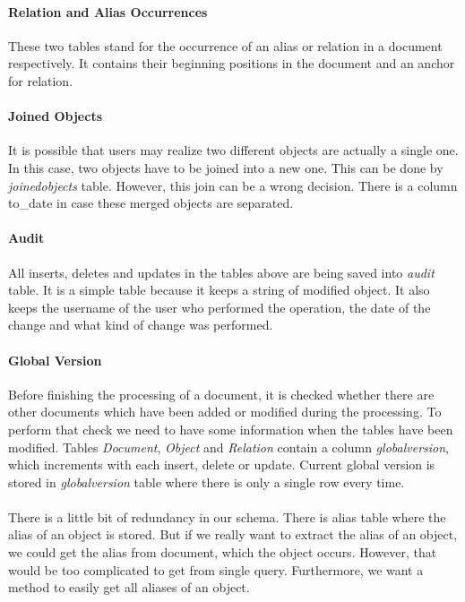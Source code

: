 \paragraph{Relation and Alias Occurrences} These two tables stand for the
occurrence of an alias or relation in a document respectively. It contains their
beginning positions in the document and an anchor for relation. 

\paragraph{Joined Objects} It is possible that users may realize two different
objects are actually a single one. In this case, two objects have to be joined
into a new one. This can be done by \emph{joinedobjects} table. However, this
join can be a wrong decision. There is a column to\_{}date in case these merged
objects are separated.

\paragraph{Audit} All inserts, deletes and updates in the tables above are being
saved into \emph{audit} table. It is a simple table because it keeps a string of
modified object. It also keeps the username of the user who performed the
operation, the date of the change and what kind of change was performed.
 
\paragraph{Global Version} Before finishing the processing of a document, it is
checked whether there are other documents which have been added or modified
during the processing. To perform that check we need to have some information
when the tables have been modified. Tables \emph{Document}, \emph{Object} and
\emph{Relation} contain a column \emph{globalversion}, which increments with
each insert, delete or update. Current global version is stored in
\emph{globalversion} table where there is only a single row every time.

\paragraph{} There is a little bit of redundancy in our schema.
There is alias table where the alias of an object is stored. But if we really
want to extract the alias of an object, we could get the alias from document,
which the object occurs. However, that would be too complicated to get from
single query. Furthermore, we want a method to easily get all aliases of an
object.

